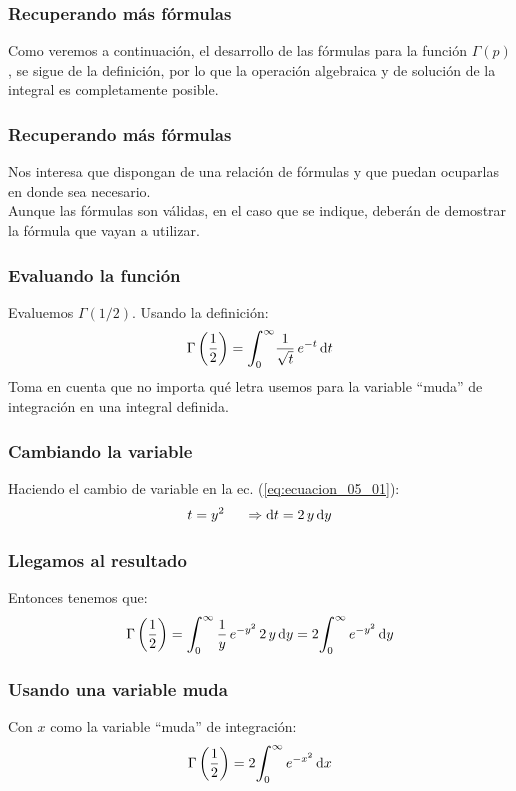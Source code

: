 \documentclass[12pt]{beamer}
\begin{document}
\begin{frame}
\frametitle{Recuperando más fórmulas}
Como veremos a continuación, el desarrollo de las fórmulas para la función $\Gamma (p)$, se sigue de la definición, por lo que la operación algebraica y de solución de la integral es completamente posible.
\end{frame}
\begin{frame}
\frametitle{Recuperando más fórmulas}
Nos interesa que dispongan de una relación de fórmulas y que puedan ocuparlas en donde sea necesario.
\\
\bigskip
\pause
Aunque las fórmulas son válidas, en el caso que se indique, deberán de demostrar la fórmula que vayan a utilizar.
\end{frame}
\begin{frame}
\frametitle{Evaluando la función}
Evaluemos $\Gamma (1/2)$. Usando la definición:
\pause
\begin{align}
\Gamma \left( \dfrac{1}{2}\right) = \scaleint{6ex}_{\bs 0}^{\infty} \dfrac{1}{\sqrt{t}} \, e^{-t} \dd{t}
\label{eq:ecuacion_05_01}
\end{align}
Toma en cuenta que no importa qué letra usemos para la variable \enquote{muda} de integración en una integral definida.
\end{frame} 
\begin{frame}
\frametitle{Cambiando la variable}
Haciendo el cambio de variable en la ec. (\ref{eq:ecuacion_05_01}):
\pause
\begin{align*}
t = y^{2} \hspace{0.5cm} \Rightarrow \dd{t} = 2 \, y \dd{y}
\end{align*}
\end{frame}
\begin{frame}
\frametitle{Llegamos al resultado}
Entonces tenemos que:
\pause
\begin{align*}
\Gamma \left( \dfrac{1}{2} \right) = \scaleint{6ex}_{\bs 0}^{\infty} \, \dfrac{1}{y} \, e^{-y^{2}} \, 2 \, y \dd{y} = 2 \scaleint{6ex}_{\bs 0}^{\infty} \, e^{-y^{2}} \dd{y}
\end{align*}
\end{frame}
\begin{frame}
\frametitle{Usando una variable muda}
Con $x$ como la variable \enquote{muda} de integración:
\pause
\begin{align}
\Gamma \left( \dfrac{1}{2} \right) = 2 \scaleint{6ex}_{\bs 0}^{\infty} \, e^{-x^{2}} \dd{x}
\label{eq:ecuacion_05_02}
\end{align}
\end{frame}
\end{document}
